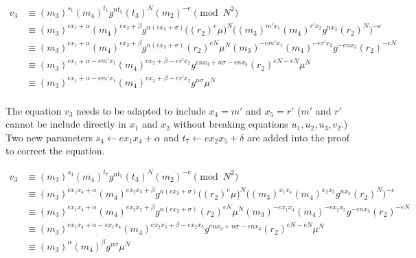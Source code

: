 \begin{equation}
\begin{split}
   v_3 &\equiv (m_3)^{s_1} (m_4)^{t_1} g^{nt_5} (t_3)^{N} (m_2)^{-e} \pmod{N^2} \\
       &\equiv (m_3)^{ex_1 + \alpha} (m_4)^{ex_2 + \beta} g^{n(ex_3 + \sigma)}
       \big((r_2)^e \mu\big)^{N}
       \big((m_3)^{m' x_1} (m_4)^{r' x_2} g^{nx_3} (r_2)^{N}\big)^{-e} \\
       &\equiv (m_3)^{ex_1 + \alpha} (m_4)^{ex_2 + \beta} g^{n(ex_3 + \sigma)}
       (r_2)^{eN} \mu^{N}
       (m_3)^{-e m' x_1} (m_4)^{-e r' x_2} g^{-e nx_3} (r_2)^{-eN} \\
       &\equiv (m_3)^{ex_1 + \alpha - e m' x_1} (m_4)^{ex_2 + \beta - e r' x_2}
       g^{enx_3 + n\sigma - enx_3} (r_2)^{eN - eN} \mu^{N}  \\
       &\equiv (m_3)^{ex_1 + \alpha - e m' x_1} (m_4)^{ex_2 + \beta - e r' x_2}
       g^{n\sigma} \mu^{N}  \\
\end{split}
\end{equation}

The equation $v_3$ needs to be adapted to include $x_4 = m'$ and $x_5 = r'$
($m'$ and $r'$ cannot be include directly in $x_1$ and $x_2$ without breaking
equations $u_1, u_2, u_3, v_2$.) Two new parameters $s_4 \leftarrow ex_1 x_4 +
\alpha$ and $t_7 \leftarrow ex_2 x_5 + \delta$ are added into the proof to
correct the equation.

\begin{equation}
\begin{split}
   v_3 &\equiv (m_3)^{s_4} (m_4)^{t_7} g^{nt_5} (t_3)^{N} (m_2)^{-e} \pmod{N^2} \\
       &\equiv (m_3)^{ex_1x_4 + \alpha} (m_4)^{ex_2x_5 + \beta} g^{n(ex_3 + \sigma)}
       \big((r_2)^e \mu\big)^{N}
       \big((m_3)^{x_1x_4} (m_4)^{x_2x_5} g^{nx_3} (r_2)^{N}\big)^{-e} \\
       &\equiv (m_3)^{ex_1x_4 + \alpha} (m_4)^{ex_2x_5 + \beta} g^{n(ex_3 + \sigma)}
       (r_2)^{eN} \mu^{N}
       (m_3)^{-e x_1x_4} (m_4)^{-e x_2x_5} g^{-e nx_3} (r_2)^{-eN} \\
       &\equiv (m_3)^{ex_1x_4 + \alpha - e x_1x_4} (m_4)^{ex_2x_5 + \beta - e x_2x_5}
       g^{enx_3 + n\sigma - enx_3} (r_2)^{eN - eN} \mu^{N}  \\
       &\equiv (m_3)^{\alpha} (m_4)^{\beta} g^{n\sigma} \mu^{N} \\
\end{split}
\end{equation}


